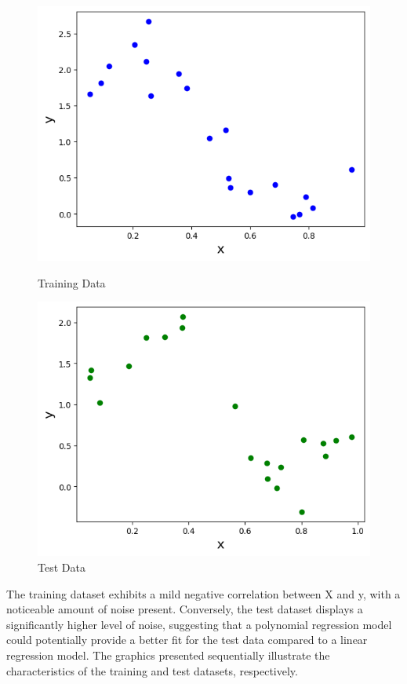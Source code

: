 \documentclass[10pt]{article}
\begin{document}
\begin{figure}[h!]
  \centering
  \begin{minipage}[b]{0.45\textwidth}
    \includegraphics[width=\textwidth]{train_data.png}
    \caption{Training Data}
  \end{minipage}
  \hfill
  \begin{minipage}[b]{0.45\textwidth}
    \includegraphics[width=\textwidth]{test_data.png}
    \caption{Test Data}
  \end{minipage}
\end{figure}

The training dataset exhibits a mild negative correlation between X and y, with a noticeable amount of noise present. Conversely, the test dataset displays a significantly higher level of noise, suggesting that a polynomial regression model could potentially provide a better fit for the test data compared to a linear regression model. The graphics presented sequentially illustrate the characteristics of the training and test datasets, respectively.\\
\end{document}
